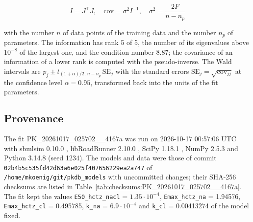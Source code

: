 \documentclass{article}
\begin{document}
\begin{equation}
I = J^\top J, \quad \mathrm{cov} = \sigma^2 I^{-1}, \quad \sigma^2 = \frac{2 F}{n - n_p}
\end{equation}

with the number $n$ of data points of the training data and the number $n_p$ of parameters. The information has rank 5 of 5, the number of its eigenvalues above $10^{-8}$ of the largest one, and the condition number 8.87; the covariance of an information of a lower rank is computed with the pseudo-inverse. The Wald intervals are $\hat{p}_j \pm t_{(1+\alpha)/2,\, n-n_p}\, \mathrm{SE}_j$ with the standard errors $\mathrm{SE}_j = \sqrt{\mathrm{cov}_{jj}}$ at the confidence level $\alpha = 0.95$, transformed back into the units of the fit parameters.

\subsection{Provenance}

The fit PK\_20261017\_025702\_\_4167a was run on 2026-10-17 00:57:06 UTC with sbmlsim 0.10.0 \cite{Koenig2026_sbmlsim}, libRoadRunner 2.10.0 \cite{Welsh2023}, SciPy 1.18.1 \cite{Virtanen2020}, NumPy 2.5.3 \cite{Harris2020} and Python 3.14.8 (seed 1234). The models and data were those of commit \texttt{02b4b5c535fd42d63a6e025f407656229ea2a747} of \texttt{/home/mkoenig/git/pkdb\_models} with uncommitted changes; their SHA-256 checksums are listed in Table~\ref{tab:checksums:PK_20261017_025702__4167a}. The fit kept the values \texttt{E50\_hctz\_nacl} = $1.35 \cdot 10^{-4}$, \texttt{Emax\_hctz\_na} = 1.94576, \texttt{Emax\_hctz\_cl} = 0.495785, \texttt{k\_na} = $6.9 \cdot 10^{-4}$ and \texttt{k\_cl} = 0.00413274 of the model fixed.
\end{document}
